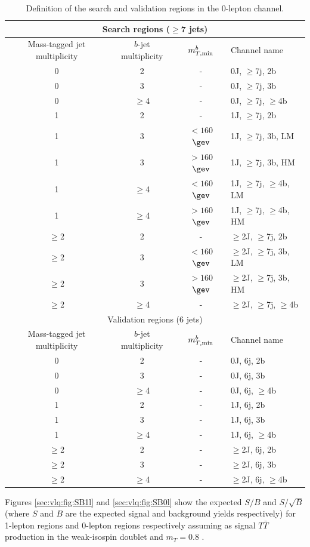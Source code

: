 \begin{table}[htb!]\footnotesize
\begin{center}
\begin{tabular}{ccc l}
\toprule\toprule
\multicolumn{4}{c}{Search regions ($\geq$7 jets)} \\     
\midrule\midrule
Mass-tagged jet multiplicity & $b$-jet multiplicity  & $m_{T,{\rm min}}^{b}$ & Channel name \\
\midrule
0 & 2 & - & 0J, $\geq$7j, 2b \\
0 & 3 & - & 0J, $\geq$7j, 3b \\
0 & $\geq$4 & - & 0J, $\geq$7j, $\geq$4b \\     
1 & 2 & - & 1J, $\geq$7j, 2b \\
1 & 3 & $<160$ $\gev$ & 1J, $\geq$7j, 3b, LM \\
1 & 3 & $>160$ $\gev$ & 1J, $\geq$7j, 3b, HM \\
1 & $\geq$4 & $<160$ $\gev$ & 1J, $\geq$7j, $\geq$4b, LM \\ 
1 & $\geq$4 & $>160$ $\gev$ & 1J, $\geq$7j, $\geq$4b, HM \\         
$\geq$2 & 2 & - & $\geq$2J, $\geq$7j, 2b \\
$\geq$2 & 3 & $<160$ $\gev$ & $\geq$2J, $\geq$7j, 3b, LM \\
$\geq$2 & 3 & $>160$ $\gev$ & $\geq$2J, $\geq$7j, 3b, HM \\
$\geq$2 & $\geq$4 & - & $\geq$2J, $\geq$7j, $\geq$4b \\     
\midrule\midrule
\multicolumn{4}{c}{Validation regions (6 jets)} \\     
\midrule
Mass-tagged jet multiplicity & $b$-jet multiplicity  & $m_{T,{\rm min}}^{b}$ & Channel name \\
\midrule
0 & 2 & - & 0J, 6j, 2b \\
0 & 3 & - & 0J, 6j, 3b \\
0 & $\geq$4 & - & 0J, 6j, $\geq$4b \\     
1 & 2 & - & 1J, 6j, 2b \\
1 & 3 & - & 1J, 6j, 3b \\
1 & $\geq$4 & - & 1J, 6j, $\geq$4b \\         
$\geq$2 & 2 & - & $\geq$2J, 6j, 2b \\
$\geq$2 & 3 & - & $\geq$2J, 6j, 3b \\
$\geq$2 & $\geq$4 & - & $\geq$2J, 6j, $\geq$4b \\     
\bottomrule\bottomrule
\end{tabular}
\captionsetup{width=0.85\textwidth} \caption{\small{Definition of the search and validation regions in the 0-lepton channel.}}
\label{tab:VLQ:fit:channels0L}
\end{center}
\end{table}
Figures \ref{sec:vlq:fig:SB1l} and \ref{sec:vlq:fig:SB0l} show the expected $S/B$ and $S/\sqrt{B}$ (where $S$ and $B$ are the expected signal and background yields respectively) for 1-lepton regions and 0-lepton regions respectively assuming as signal $T\bar{T}$ production in the weak-isospin doublet and $m_{T} = 0.8$ \tev.

